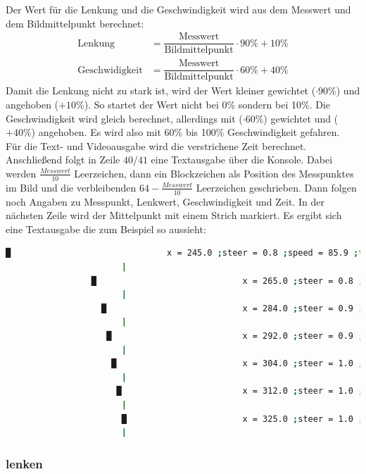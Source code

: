 \documentclass[a4paper, 12pt]{scrartcl}
\begin{document}
Der Wert für die Lenkung und die Geschwindigkeit wird aus dem Messwert und dem Bildmittelpunkt berechnet:
\begin{align}
	\text{Lenkung}&=\dfrac{\text{Messwert}}{\text{Bildmittelpunkt}}\cdot 90\% + 10\% \\
	\text{Geschwidigkeit}&=\dfrac{\text{Messwert}}{\text{Bildmittelpunkt}}\cdot 60\% + 40\%
\end{align}
Damit die Lenkung nicht zu stark ist, wird der Wert kleiner gewichtet ($\cdot 90\%$) und angehoben ($+10\%$). So startet der Wert nicht bei 0\% sondern bei 10\%.
Die Geschwindigkeit wird gleich berechnet, allerdings mit ($\cdot 60\%$) gewichtet und ($+40\%$) angehoben. Es wird also mit 60\% bis 100\% Geschwindigkeit gefahren.\\

Für die Text- und Videoausgabe wird die verstrichene Zeit berechnet.
Anschließend folgt in Zeile $40/41$ eine Textausgabe über die Konsole. Dabei werden $\frac{\textit{Messwert}}{10}$ Leerzeichen, dann ein Blockzeichen als Position des Messpunktes im Bild und die verbleibenden $64-\frac{\textit{Messwert}}{10}$ Leerzeichen geschrieben. Dann folgen noch Angaben zu Messpunkt, Lenkwert, Geschwindigkeit und Zeit. In der nächsten Zeile wird der Mittelpunkt mit einem Strich markiert. Es ergibt sich eine Textausgabe die zum Beispiel so aussieht:

\begin{lstlisting}[language=bash,basicstyle=\tiny,numbers=none]
               █                               x = 245.0 ;steer = 0.8 ;speed = 85.9 ;time = 00:00.00
                       |
                 █                             x = 265.0 ;steer = 0.8 ;speed = 89.7 ;time = 00:00.04
                       |
                   █                           x = 284.0 ;steer = 0.9 ;speed = 93.2 ;time = 00:00.08
                       |
                    █                          x = 292.0 ;steer = 0.9 ;speed = 94.8 ;time = 00:00.12
                       |
                     █                         x = 304.0 ;steer = 1.0 ;speed = 97.0 ;time = 00:00.16
                       |
                      █                        x = 312.0 ;steer = 1.0 ;speed = 98.5 ;time = 00:00.20
                       |
                       █                       x = 325.0 ;steer = 1.0 ;speed = 99.1 ;time = 00:00.24
                       |
\end{lstlisting}

\newpage
\subsubsection{lenken}	%

\end{document}
